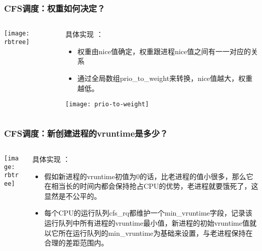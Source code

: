 \begin{frame}
	\frametitle{CFS调度：权重如何决定？}
	\begin{columns}
		\begin{column}{.4\textwidth}
			\Large \centering
			
			\texttt{[image: rbtree]}

		\end{column} \pause
		
		\begin{column}{.6\textwidth}

			具体实现 ：
			\begin{itemize}
				\item 权重由nice值确定，权重跟进程nice值之间有一一对应的关系
				\item 通过全局数组prio\_to\_weight来转换，nice值越大，权重越低。

			\end{itemize}
						\texttt{[image: prio-to-weight]}
		\end{column}
	\end{columns}
\end{frame}




\begin{frame}
	\frametitle{CFS调度：新创建进程的vruntime是多少？}
	\begin{columns}
		\begin{column}{.4\textwidth}
			\Large \centering
			
			\texttt{[image: rbtree]}
			
		\end{column} \pause
		
		\begin{column}{.6\textwidth}
			
			具体实现 ：
			\begin{itemize}
				\item 假如新进程的vruntime初值为0的话，比老进程的值小很多，那么它在相当长的时间内都会保持抢占CPU的优势，老进程就要饿死了，这显然是不公平的。
				\item 每个CPU的运行队列cfs\_rq都维护一个min\_vruntime字段，记录该运行队列中所有进程的vruntime最小值，新进程的初始vruntime值就以它所在运行队列的min\_vruntime为基础来设置，与老进程保持在合理的差距范围内。
			\end{itemize}
		\end{column}
	\end{columns}
\end{frame}


